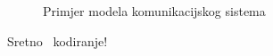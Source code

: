 \documentclass[letterpaper,10pt]{article}
\newcommand{\sretno}[1]
{\normalsize{\color{red}#1}\color{blue}~}
\begin{document}
\begin{figure}[h]
\begin{tikzpicture}[scale=0.5]
\end{tikzpicture}
\caption{Primjer modela komunikacijskog sistema} \label{Slicica:fig6}
\end{figure}\hfill{}
\begin{flushright}
\vfill{}
\sretno{Sretno} kodiranje!
\end{flushright}
\end{document}
